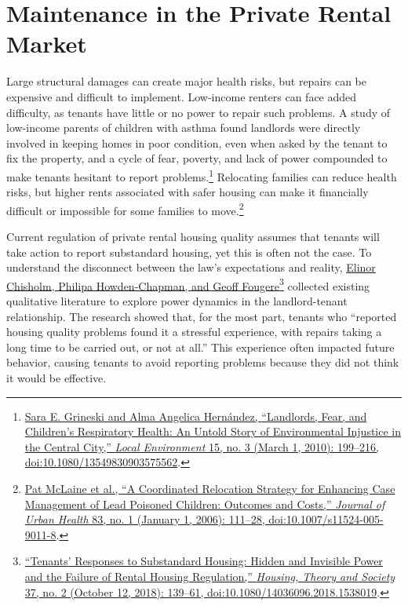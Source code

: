 \documentclass[
  openany]{book}
\begin{document}
\hypertarget{maintenance-in-the-private-rental-market}{%
\section{Maintenance in the Private Rental Market}\label{maintenance-in-the-private-rental-market}}

Large structural damages can create major health risks, but repairs can be expensive and difficult to implement. Low-income renters can face added difficulty, as tenants have little or no power to repair such problems. A study of low-income parents of children with asthma found landlords were directly involved in keeping homes in poor condition, even when asked by the tenant to fix the property, and a cycle of fear, poverty, and lack of power compounded to make tenants hesitant to report problems.\footnote{\protect\hyperlink{ref-grineski2010}{Sara E. Grineski and Alma Angelica Hernández, {``Landlords, Fear, and Children's Respiratory Health: An Untold Story of Environmental Injustice in the Central City,''} \emph{Local Environment} 15, no. 3 (March 1, 2010): 199--216, doi:\href{https://doi.org/10.1080/13549830903575562}{10.1080/13549830903575562}}.} Relocating families can reduce health risks, but higher rents associated with safer housing can make it financially difficult or impossible for some families to move.\footnote{\protect\hyperlink{ref-mclaine2006}{Pat McLaine et al., {``A Coordinated Relocation Strategy for Enhancing Case Management of Lead Poisoned Children: Outcomes and Costs,''} \emph{Journal of Urban Health} 83, no. 1 (January 1, 2006): 111--28, doi:\href{https://doi.org/10.1007/s11524-005-9011-8}{10.1007/s11524-005-9011-8}}.}

Current regulation of private rental housing quality assumes that tenants will take action to report substandard housing, yet this is often not the case. To understand the disconnect between the law's expectations and reality, \protect\hyperlink{ref-chisholm2018}{Elinor Chisholm, Philipa Howden-Chapman, and Geoff Fougere}\footnote{\protect\hyperlink{ref-chisholm2018}{{``Tenants{'} Responses to Substandard Housing: Hidden and Invisible Power and the Failure of Rental Housing Regulation,''} \emph{Housing, Theory and Society} 37, no. 2 (October 12, 2018): 139--61, doi:\href{https://doi.org/10.1080/14036096.2018.1538019}{10.1080/14036096.2018.1538019}}.} collected existing qualitative literature to explore power dynamics in the landlord-tenant relationship. The research showed that, for the most part, tenants who ``reported housing quality problems found it a stressful experience, with repairs taking a long time to be carried out, or not at all.'' This experience often impacted future behavior, causing tenants to avoid reporting problems because they did not think it would be effective.
\end{document}
